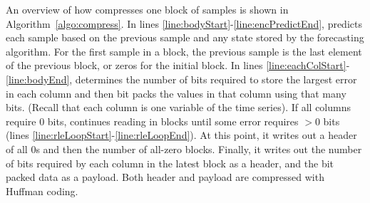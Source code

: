 

\newcommand{\err}{\texttt{err}}
\newcommand{\nbits}{\texttt{nbits}}
\newcommand{\packed}{\texttt{packed}}
\newcommand{\buff}{$\texttt{buff}$}
\newcommand{\bytes}{\texttt{bytes}}
\newcommand{\payload}{\texttt{payload}}
\newcommand{\f}{\texttt{f}}
\newcommand{\fore}{\texttt{forecaster}}
\newcommand{\self}{\texttt{self}}


An overview of how \minesp compresses one block of samples is shown in Algorithm~\ref{algo:compress}. In lines \ref{line:bodyStart}-\ref{line:encPredictEnd}, \minesp predicts each sample based on the previous sample and any state stored by the forecasting algorithm. For the first sample in a block, the previous sample is the last element of the previous block, or zeros for the initial block. In lines \ref{line:eachColStart}-\ref{line:bodyEnd}, \minesp determines the number of bits required to store the largest error in each column and then bit packs the values in that column using that many bits. (Recall that each column is one variable of the time series). If all columns require 0 bits, \minesp continues reading in blocks until some error requires $>$0 bits (lines \ref{line:rleLoopStart}-\ref{line:rleLoopEnd}). At this point, it writes out a header of all 0s and then the number of all-zero blocks. Finally, it writes out the number of bits required by each column in the latest block as a header, and the bit packed data as a payload. Both header and payload are compressed with Huffman coding.

